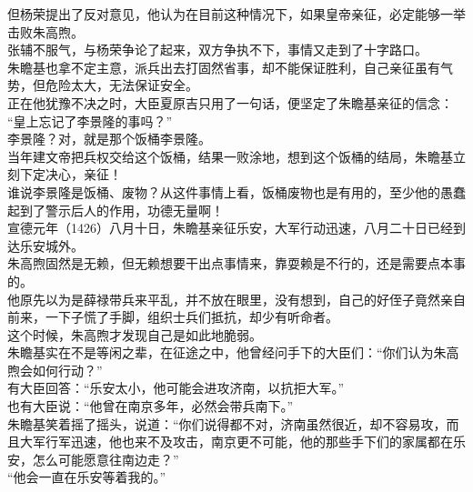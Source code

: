 \begin{multicols}{\theparacolNo}
但杨荣提出了反对意见，他认为在目前这种情况下，如果皇帝亲征，必定能够一举击败朱高煦。\\

张辅不服气，与杨荣争论了起来，双方争执不下，事情又走到了十字路口。\\

朱瞻基也拿不定主意，派兵出去打固然省事，却不能保证胜利，自己亲征虽有气势，但危险太大，无法保证安全。\\

正在他犹豫不决之时，大臣夏原吉只用了一句话，便坚定了朱瞻基亲征的信念：\\

“皇上忘记了李景隆的事吗？”\\

李景隆？对，就是那个饭桶李景隆。\\

当年建文帝把兵权交给这个饭桶，结果一败涂地，想到这个饭桶的结局，朱瞻基立刻下定决心，亲征！\\

谁说李景隆是饭桶、废物？从这件事情上看，饭桶废物也是有用的，至少他的愚蠢起到了警示后人的作用，功德无量啊！\\

宣德元年（1426）八月十日，朱瞻基亲征乐安，大军行动迅速，八月二十日已经到达乐安城外。\\

朱高煦固然是无赖，但无赖想要干出点事情来，靠耍赖是不行的，还是需要点本事的。\\

他原先以为是薛禄带兵来平乱，并不放在眼里，没有想到，自己的好侄子竟然亲自前来，一下子慌了手脚，组织士兵们抵抗，却少有听命者。\\

这个时候，朱高煦才发现自己是如此地脆弱。\\

朱瞻基实在不是等闲之辈，在征途之中，他曾经问手下的大臣们：“你们认为朱高煦会如何行动？”\\

有大臣回答：“乐安太小，他可能会进攻济南，以抗拒大军。”\\

也有大臣说：“他曾在南京多年，必然会带兵南下。”\\

朱瞻基笑着摇了摇头，说道：“你们说得都不对，济南虽然很近，却不容易攻，而且大军行军迅速，他也来不及攻击，南京更不可能，他的那些手下们的家属都在乐安，怎么可能愿意往南边走？”\\

“他会一直在乐安等着我的。”\\


\end{multicols}

